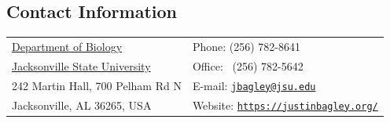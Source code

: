 \documentclass[margin,line]{res}
\begin{document}
\begin{resume}



\section{\sc Contact Information}
\vspace{.05in}
\begin{tabular}{@{}p{2.75in}p{2in}}
\href{http://www.jsu.edu/biology/}{Department of Biology} & Phone: (256) 782-8641 \\
\href{http://www.jsu.edu}{Jacksonville State University} & Office: ~(256) 782-5642 \\
242 Martin Hall, 700 Pelham Rd N & E-mail: \href{mailto:jbagley@jsu.edu}{\tt jbagley@jsu.edu} \\
Jacksonville, AL 36265, USA & Website: \href{https://justinbagley.org/}{\tt https://justinbagley.org/} 
\end{tabular}






\end{resume}
\end{document}
